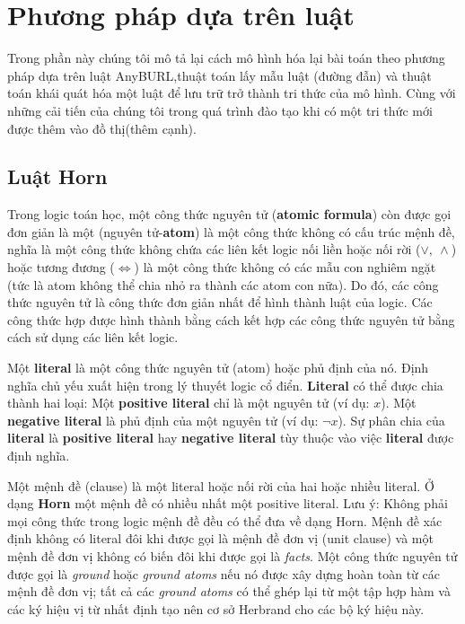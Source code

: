 \chapter{Phương pháp dựa trên luật}
\label{chap:RuleBase}

Trong phần này chúng tôi mô tả lại cách mô hình hóa lại bài toán theo phương pháp dựa trên luật AnyBURL,thuật toán lấy mẫu luật (đường đẫn) và thuật toán khái quát hóa một luật để lưu trữ trở thành tri thức của mô hình. Cùng với những cải tiến của chúng tôi trong quá trình đào tạo khi có một tri thức mới được thêm vào đồ thị(thêm cạnh).

\section{Luật Horn}
Trong logic toán học, một công thức nguyên tử (\textbf{atomic formula})\cite{wiki:Atomic} còn được gọi đơn giản là một (nguyên tử-\textbf{atom}) là một công thức không có cấu trúc mệnh đề, nghĩa là một công thức không chứa các liên kết logic nối liền hoặc nối rời (\(\vee, ~ \wedge\)) hoặc tương đương (\(\Leftrightarrow\)) là một công thức không có các mẫu con nghiêm ngặt (tức là atom không thể chia nhỏ ra thành các atom con nữa). Do đó, các công thức nguyên tử là công thức đơn giản nhất để hình thành luật của logic. Các công thức hợp được hình thành bằng cách kết hợp các công thức nguyên tử bằng cách sử dụng các liên kết logic.

Một \textbf{literal}\cite{wiki:Literal} là một công thức nguyên tử (atom) hoặc phủ định của nó. Định nghĩa chủ yếu xuất hiện trong lý thuyết logic cổ điển. \textbf{Literal} có thể được chia thành hai loại: Một \textbf{positive literal} chỉ là một nguyên tử (ví dụ: \(x\)). Một \textbf{negative literal} là phủ định của một nguyên tử (ví dụ: \(\neg x\)). Sự phân chia của \textbf{literal} là \textbf{positive literal} hay \textbf{negative literal} tùy thuộc vào việc \textbf{literal} được định nghĩa.

Một mệnh đề (clause) là một literal hoặc nối rời của hai hoặc nhiều literal. Ở dạng \textbf{Horn} một mệnh đề có nhiều nhất một positive literal. Lưu ý: Không phải mọi công thức trong logic mệnh đề đều có thể đưa về dạng Horn. Mệnh đề xác định không có literal đôi khi được gọi là mệnh đề đơn vị (unit clause) và một mệnh đề đơn vị không có biến đôi khi được gọi là \textit{facts}\cite{wiki:Horn}. Một công thức nguyên tử được gọi là \textit{ground} hoặc \textit{ground atoms} nếu nó được xây dựng hoàn toàn từ các mệnh đề đơn vị; tất cả các \textit{ground atoms} có thể ghép lại từ một tập hợp hàm và các ký hiệu vị từ nhất định tạo nên cơ sở Herbrand cho các bộ ký hiệu này\cite{wiki:Term}.

